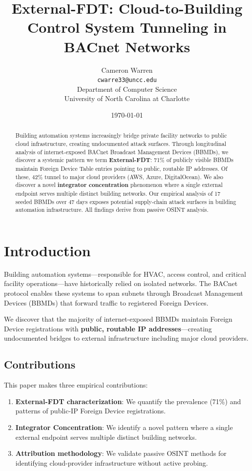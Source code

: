 \documentclass[11pt,a4paper]{article}
\title{\textbf{External-FDT}: Cloud-to-Building Control System Tunneling in BACnet Networks}
\author{Cameron Warren\\
  \texttt{cwarre33@uncc.edu}\\[0.5em]
  Department of Computer Science\\
  University of North Carolina at Charlotte
}
\date{\today}
\begin{document}
\maketitle

\begin{abstract}
Building automation systems increasingly bridge private facility networks to public 
cloud infrastructure, creating undocumented attack surfaces. Through longitudinal 
analysis of internet-exposed BACnet Broadcast Management Devices (BBMDs), we 
discover a systemic pattern we term \textbf{External-FDT}: 71\% of publicly visible 
BBMDs maintain Foreign Device Table entries pointing to public, routable IP addresses. 
Of these, 42\% tunnel to major cloud providers (AWS, Azure, DigitalOcean). We also 
discover a novel \textbf{integrator concentration} phenomenon where a single external 
endpoint serves multiple distinct building networks. Our empirical analysis of 17 seeded 
BBMDs over 47 days exposes potential supply-chain attack surfaces in building 
automation infrastructure. All findings derive from passive OSINT analysis.
\end{abstract}

\section{Introduction}
\label{sec:intro}

Building automation systems---responsible for HVAC, access control, and 
critical facility operations---have historically relied on isolated networks. 
The BACnet protocol enables these systems to span subnets through Broadcast 
Management Devices (BBMDs) that forward traffic to registered Foreign Devices.

We discover that the majority of internet-exposed BBMDs maintain Foreign 
Device registrations with \textbf{public, routable IP addresses}---creating 
undocumented bridges to external infrastructure including major cloud providers.

\subsection{Contributions}

This paper makes three empirical contributions:

\begin{enumerate}
  \item \textbf{External-FDT characterization}: We quantify the prevalence (71\%) 
    and patterns of public-IP Foreign Device registrations.
    
  \item \textbf{Integrator Concentration}: We identify a novel pattern where a 
    single external endpoint serves multiple distinct building networks.
    
  \item \textbf{Attribution methodology}: We validate passive OSINT methods 
    for identifying cloud-provider infrastructure without active probing.
\end{enumerate}
\end{document}
